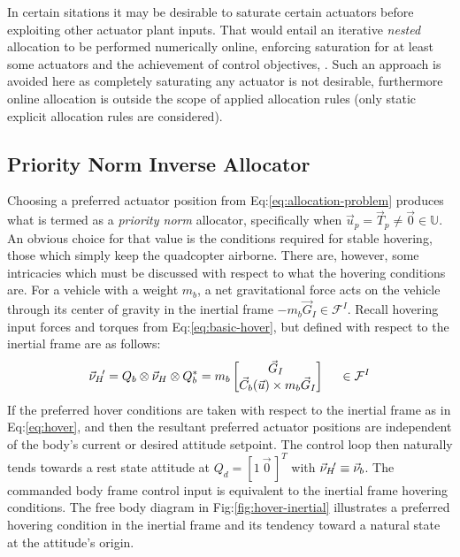 \par
In certain sitations it may be desirable to saturate certain actuators before exploiting other actuator plant inputs. That would entail an iterative \emph{nested} allocation to be performed numerically online, enforcing saturation for at least some actuators and the achievement of control objectives, \cite{allocation}. Such an approach is avoided here as completely saturating any actuator is not desirable, furthermore online allocation is outside the scope of applied allocation rules (only static explicit allocation rules are considered).
\subsection{Priority Norm Inverse Allocator}
\label{subsec:allocation.allocators.norminverse}
Choosing a preferred actuator position from Eq:\ref{eq:allocation-problem} produces what is termed as a \emph{priority norm} allocator, specifically when $\vec{u}_p=\vec{T}_p\not=\vec{0}\in\mathbb{U}$. An obvious choice for that value is the conditions required for stable hovering, those which simply keep the quadcopter airborne. There are, however, some intricacies which must be discussed with respect to what the hovering conditions are.
\newpage
For a vehicle with a weight $m_b$, a net gravitational force acts on the vehicle through its center of gravity in the inertial frame $-m_b\vec{G}_I\in\mathcal{F}^I$. Recall hovering input forces and torques from Eq:\ref{eq:basic-hover}, but defined with respect to the inertial frame are as follows:
\begin{equation}\label{eq:hover}
\vec{\nu}_H\text{}\hspace{-2pt}'=Q_b\otimes\vec{\nu}_H\otimes Q_b^*
=
m_b\begin{bmatrix}
\vec{G}_I\hspace{3pt}\\
\vec{C}_b(\vec{u}) \times m_b\vec{G}_I
\end{bmatrix}~~~~\in\mathcal{F}^I
\end{equation}
If the preferred hover conditions are taken with respect to the inertial frame as in Eq:\ref{eq:hover}, and then the resultant preferred actuator positions are independent of the body's current or desired attitude setpoint. The control loop then naturally tends towards a rest state attitude at $Q_d=[1~\vec{0}\hspace{2pt}]^T$ with $\vec{\nu}_H\text{}\hspace{-2pt}'\equiv\vec{\nu}_b$. The commanded body frame control input is equivalent to the inertial frame hovering conditions. The free body diagram in Fig:\ref{fig:hover-inertial} illustrates a preferred hovering condition in the inertial frame and its tendency toward a natural state at the attitude's origin.
